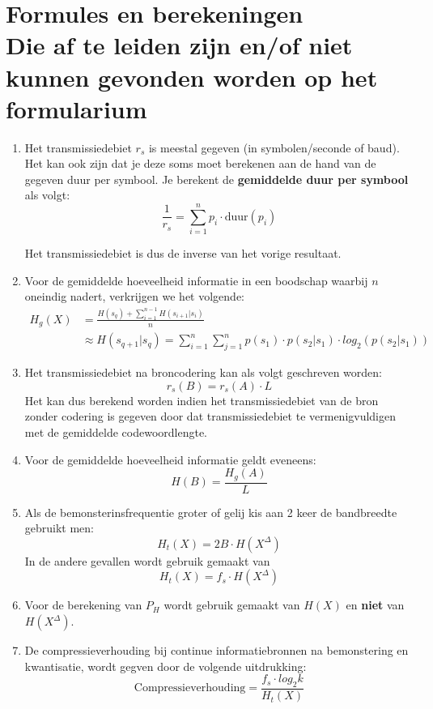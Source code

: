\documentclass[12pt,a4paper]{article}
\begin{document}
\section*{Formules en berekeningen\\ \scriptsize{Die af te leiden zijn en/of niet kunnen gevonden worden op het formularium}}
\begin{enumerate}
\item Het transmissiedebiet $r_s$ is meestal gegeven (in symbolen/seconde of baud). Het kan ook zijn dat je deze soms moet berekenen aan de hand van de gegeven duur per symbool. Je berekent de \textbf{gemiddelde duur per symbool} als volgt:
$$\frac{1}{r_s} = \sum_{i=1}^n p_i \cdot \text{duur}(p_i)$$

Het transmissiedebiet is dus de inverse van het vorige resultaat.

\item Voor de gemiddelde hoeveelheid informatie in een boodschap waarbij $n$ oneindig nadert, verkrijgen we het volgende:
\begin{align*}
H_g(X) &= \frac{H(s_q) + \sum_{i=1}^{n-1} H(s_{i+1}|s_i)}{n}\\
&\approx H(s_{q+1}|s_q) = \sum_{i=1}^n \sum_{j=1}^n p(s_1) \cdot p(s_2|s_1) \cdot log_2(p(s_2|s_1))
\end{align*}

\item Het transmissiedebiet na broncodering kan als volgt geschreven worden:
$$r_s(B) = r_s(A) \cdot L$$
Het kan dus berekend worden indien het transmissiedebiet van de bron zonder codering is gegeven door dat transmissiedebiet te vermenigvuldigen met de gemiddelde codewoordlengte.

\item Voor de gemiddelde hoeveelheid informatie geldt eveneens:
$$H(B) = \frac{H_g(A)}{L}$$

\item Als de bemonsterinsfrequentie groter of gelij kis aan 2 keer de bandbreedte gebruikt men:
$$H_t(X) = 2B \cdot H(X^{\Delta})$$
In de andere gevallen wordt gebruik gemaakt van 
$$H_t(X) = f_s \cdot H(X^{\Delta})$$

\item Voor de berekening van $P_H$ wordt gebruik gemaakt van $H(X)$ en \textbf{niet} van $H(X^{\Delta})$.

\item De compressieverhouding bij continue informatiebronnen na bemonstering en kwantisatie, wordt gegven door de volgende uitdrukking:
$$\text{Compressieverhouding} = \frac{f_s \cdot log_2 k}{H_t(X)}$$


\end{enumerate}
\end{document}
